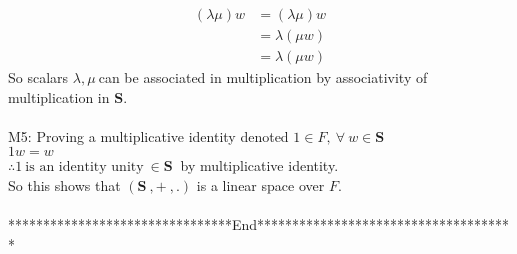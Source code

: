 \documentclass[10pt,a4paper]{article}
\numberwithin{equation}{section}
\begin{document}
\begin{align*}
	(\lambda\mu)w &=(\lambda\mu)w \\
	&=\lambda(\mu w) \\
	&= \lambda(\mu w)
\end{align*}
So scalars $\lambda,\mu~$can be associated in multiplication by associativity of multiplication in $\mathbf{S}$. \\
~\\
M5: Proving a multiplicative identity denoted $1 \in F,~\forall~w \in\mathbf{S}$ \\
$1w=w$ \\
$\therefore 1~ \text{is an identity unity}~ \in\mathbf{S} ~$ by multiplicative identity.\\
So this shows that $(\textbf{S}~,+~,.)$ is a linear space over $F$. \\
~\\
********************************End*************************************
\end{document}
